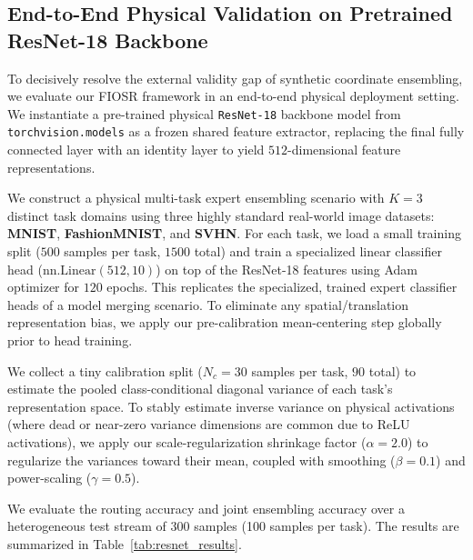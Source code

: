 \subsection{End-to-End Physical Validation on Pretrained ResNet-18 Backbone}
\label{sec:resnet_validation}

To decisively resolve the external validity gap of synthetic coordinate ensembling, we evaluate our FIOSR framework in an end-to-end physical deployment setting. We instantiate a pre-trained physical \texttt{ResNet-18} backbone model from \texttt{torchvision.models} as a frozen shared feature extractor, replacing the final fully connected layer with an identity layer to yield $512$-dimensional feature representations.

We construct a physical multi-task expert ensembling scenario with $K=3$ distinct task domains using three highly standard real-world image datasets: \textbf{MNIST}, \textbf{FashionMNIST}, and \textbf{SVHN}. For each task, we load a small training split ($500$ samples per task, $1500$ total) and train a specialized linear classifier head ($\text{nn.Linear}(512, 10)$) on top of the ResNet-18 features using Adam optimizer for $120$ epochs. This replicates the specialized, trained expert classifier heads of a model merging scenario. To eliminate any spatial/translation representation bias, we apply our pre-calibration mean-centering step globally prior to head training.

We collect a tiny calibration split ($N_c = 30$ samples per task, $90$ total) to estimate the pooled class-conditional diagonal variance of each task's representation space. To stably estimate inverse variance on physical activations (where dead or near-zero variance dimensions are common due to ReLU activations), we apply our scale-regularization shrinkage factor ($\alpha = 2.0$) to regularize the variances toward their mean, coupled with smoothing ($\beta=0.1$) and power-scaling ($\gamma=0.5$). 

We evaluate the routing accuracy and joint ensembling accuracy over a heterogeneous test stream of $300$ samples (100 samples per task). The results are summarized in Table~\ref{tab:resnet_results}.

